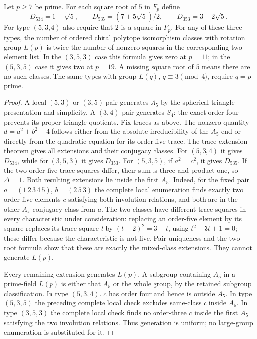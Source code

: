 \begin{theorem}\label{E.PrimeExceptional}
Let $p\ge7$ be prime. For each square root of $5$ in $F_p$ define
\[
 D_{534}=1\pm\sqrt5,\qquad
 D_{535}=(7\pm5\sqrt5)/2,\qquad
 D_{353}=3\pm2\sqrt5.
\]
For type $(5,3,4)$ also require that $2$ is a square in $F_p$.
For any of these three types, the number of ordered chiral polytope
isomorphism classes with rotation group $L(p)$ is twice the number
of nonzero squares in the corresponding two-element list.
In the $(3,5,3)$ case this formula gives zero at $p=11$; in the
$(5,3,5)$ case it gives two at $p=19$. A missing square root of $5$
means there are no such classes.
The same types with group $L(q)$, $q\equiv3\pmod4$, require $q=p$ prime.
\end{theorem}
\begin{proof}
A local $(5,3)$ or $(3,5)$ pair generates $A_5$ by the spherical
triangle presentation and simplicity. A $(3,4)$ pair generates $S_4$:
the exact order four prevents its proper triangle quotients. Fix
traces as above. The nonzero quantity $d=a^2+b^2-4$ follows either
from the absolute irreducibility of the $A_5$ end or directly from
the quadratic equation for its order-five trace. The trace extension
theorem gives all extensions and their conjugacy classes.
For $(5,3,4)$ it gives $D_{534}$, while for $(3,5,3)$ it gives $D_{353}$.
For $(5,3,5)$, if $a^2=c^2$, it gives $D_{535}$.
If the two order-five trace squares differ, their sum is three and
product one, so $\Delta=1$. Both resulting extensions lie inside the
first $A_5$. Indeed, for the fixed pair
$a=(1\,2\,3\,4\,5)$, $b=(2\,5\,3)$ the complete local enumeration
finds exactly two order-five elements $c$ satisfying both involution
relations, and both are in the other $A_5$ conjugacy class from $a$.
The two classes have different trace squares in every characteristic
under consideration: replacing an order-five element by its square
replaces its trace square $t$ by $(t-2)^2=3-t$, using
$t^2-3t+1=0$; these differ because the characteristic is not five. Pair uniqueness and the two-root formula show
that these are exactly the mixed-class extensions. They cannot generate
$L(p)$.

Every remaining extension generates $L(p)$. A subgroup containing
$A_5$ in a prime-field $L(p)$ is either that $A_5$ or the whole group,
by the retained subgroup classification. In type $(5,3,4)$, $c$ has
order four and hence is outside $A_5$. In type $(5,3,5)$ the preceding
complete local check excludes same-class $c$ inside $A_5$.
In type $(3,5,3)$ the complete local check finds no order-three $c$
inside the first $A_5$ satisfying the two involution relations.
Thus generation is uniform; no large-group enumeration is substituted
for it.


\end{proof}
